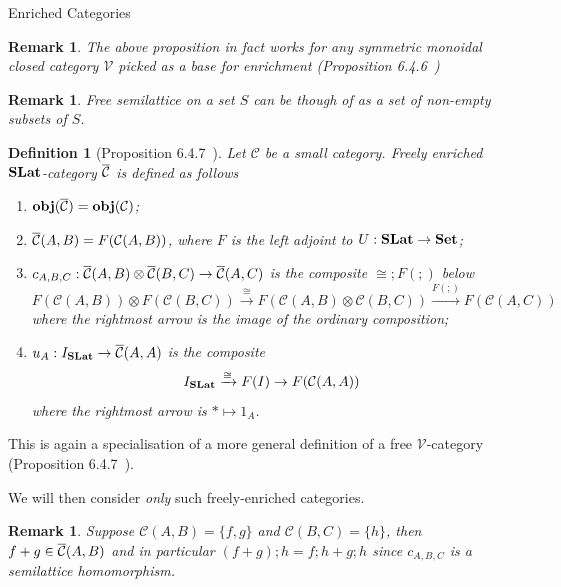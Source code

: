 \documentclass[acmsmall, screen, nonacm]{acmart}
\newtheorem{definition}[theorem]{Definition}
\newtheorem{remark}[theorem]{Remark}
\begin{document}
\begin{section}{Enriched Categories}
\begin{remark}
  The above proposition in fact works for any symmetric monoidal closed category $\mathcal{V}$ picked as a base for enrichment (Proposition 6.4.6~\cite{Borceux_1994}) 
\end{remark}

\begin{remark}

  Free semilattice on a set $S$ can be though of as a set of non-empty subsets of $S$.
\end{remark}

\begin{definition}[Proposition 6.4.7~\cite{Borceux_1994}]
\label{def:free_slat}
  Let $\mathcal{C}$ be a small category.
  Freely enriched $\mathbf{SLat}$-category ${\overline{\mathcal{C}}}$ is defined as follows
  \begin{enumerate}
    \item ${\mathbf{obj}({\overline{\mathcal{C}}})} = {\mathbf{obj}(\mathcal{C})}$;
    \item ${\overline{\mathcal{C}}}(A,B) = F(\mathcal{C}(A,B))$, where $F$ is the left adjoint to $U : \mathbf{SLat} \to \mathbf{Set}$;
    \item $c_{A,B,C} : {\overline{\mathcal{C}}}(A,B) \otimes {\overline{\mathcal{C}}}(B,C) \to {\overline{\mathcal{C}}}(A,C)$ is the composite $\cong ; F(;)$ below
    \[
    F(\mathcal{C}(A,B)) \otimes F(\mathcal{C}(B,C)) \xrightarrow{\cong} F(\mathcal{C}(A,B) \otimes \mathcal{C}(B,C)) \xrightarrow{F(;)} F(\mathcal{C}(A,C))
    \] 
    where the rightmost arrow is the image of the ordinary composition;
    \item $u_{A} : I_{\mathbf{SLat}} \to {\overline{\mathcal{C}}}(A,A)$ is the composite
    \[
    I_{\mathbf{SLat}} \xrightarrow{\cong} F(I) \to F(\mathcal{C}(A,A))
    \]
    where the rightmost arrow is $* \mapsto 1_{A}$.
  \end{enumerate}
\end{definition}

This is again a specialisation of a more general definition of a free $\mathcal{V}$-category (Proposition 6.4.7~\cite{Borceux_1994}).

We will then consider \textit{only} such freely-enriched categories.

\begin{remark}
  Suppose $\mathcal{C}(A,B) = \{f,g\}$ and $\mathcal{C}(B,C) = \{h\}$, then $f + g \in {\overline{\mathcal{C}}}(A,B)$ and in particular $(f+g);h = f;h + g;h$ since $c_{A,B,C}$ is a semilattice homomorphism.
\end{remark}


\end{section}
\end{document}
